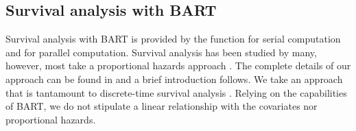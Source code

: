 \documentclass[article]{jss}
\begin{document}

\subsection{Survival analysis with BART}
 
Survival analysis with BART is provided by the 
function for serial computation and  for parallel
computation.  Survival analysis has been studied by many, however,
most take a proportional hazards approach
\citep{Cox72,KalbPren80,KleiMoes06}.
The complete details of our approach can be found in
\citet{SparLoga16} and a brief introduction follows.  We take an
approach that is tantamount to discrete-time survival analysis
\citep{Thom77,ArjaHaar87,Fahr14}.  Relying on the
capabilities of BART, we do not stipulate a linear relationship with
the covariates nor proportional hazards.  
\end{document}
